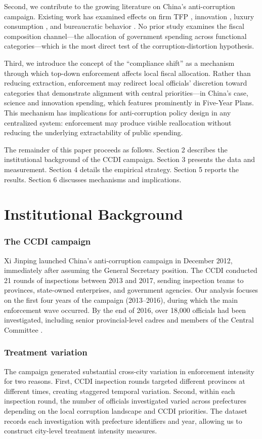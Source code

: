 \documentclass[12pt]{article}
\begin{document}
Second, we contribute to the growing literature on China's anti-corruption campaign. Existing work has examined effects on firm TFP \citep{xu2018}, innovation \citep{giannetti2021}, luxury consumption \citep{lin2020}, and bureaucratic behavior \citep{li2019}. No prior study examines the fiscal composition channel---the allocation of government spending across functional categories---which is the most direct test of the corruption-distortion hypothesis.

Third, we introduce the concept of the ``compliance shift'' as a mechanism through which top-down enforcement affects local fiscal allocation. Rather than reducing extraction, enforcement may redirect local officials' discretion toward categories that demonstrate alignment with central priorities---in China's case, science and innovation spending, which features prominently in Five-Year Plans. This mechanism has implications for anti-corruption policy design in any centralized system: enforcement may produce visible reallocation without reducing the underlying extractability of public spending.

The remainder of this paper proceeds as follows. Section 2 describes the institutional background of the CCDI campaign. Section 3 presents the data and measurement. Section 4 details the empirical strategy. Section 5 reports the results. Section 6 discusses mechanisms and implications.


\section{Institutional Background}

\subsubsection*{The CCDI campaign} Xi Jinping launched China's anti-corruption campaign in December 2012, immediately after assuming the General Secretary position. The CCDI conducted 21 rounds of inspections between 2013 and 2017, sending inspection teams to provinces, state-owned enterprises, and government agencies. Our analysis focuses on the first four years of the campaign (2013--2016), during which the main enforcement wave occurred. By the end of 2016, over 18,000 officials had been investigated, including senior provincial-level cadres and members of the Central Committee \citep{wang2020}.

\subsubsection*{Treatment variation} The campaign generated substantial cross-city variation in enforcement intensity for two reasons. First, CCDI inspection rounds targeted different provinces at different times, creating staggered temporal variation. Second, within each inspection round, the number of officials investigated varied across prefectures depending on the local corruption landscape and CCDI priorities. The \citet{wang2020data} dataset records each investigation with prefecture identifiers and year, allowing us to construct city-level treatment intensity measures.
\end{document}
